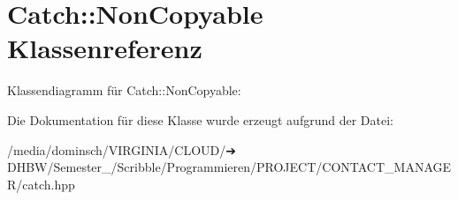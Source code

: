 \hypertarget{classCatch_1_1NonCopyable}{}\section{Catch\+:\+:Non\+Copyable Klassenreferenz}
\label{classCatch_1_1NonCopyable}


Klassendiagramm für Catch\+:\+:Non\+Copyable\+:


Die Dokumentation für diese Klasse wurde erzeugt aufgrund der Datei\+:\begin{DoxyCompactItemize}
\item 
/media/dominsch/\+V\+I\+R\+G\+I\+N\+I\+A/\+C\+L\+O\+U\+D/➔ D\+H\+B\+W/\+Semester\+\_/\+Scribble/\+Programmieren/\+P\+R\+O\+J\+E\+C\+T/\+C\+O\+N\+T\+A\+C\+T\+\_\+\+M\+A\+N\+A\+G\+E\+R/catch.\+hpp\end{DoxyCompactItemize}
